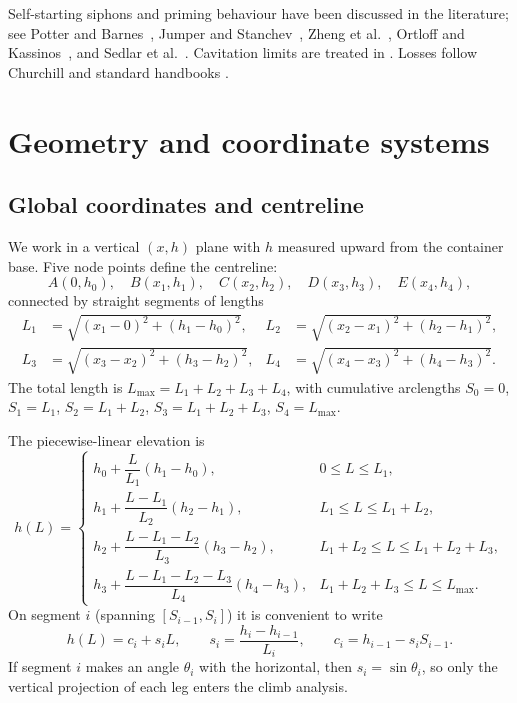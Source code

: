\documentclass[11pt]{article}
\begin{document}
Self-starting siphons and priming behaviour have been discussed in the literature; see Potter and Barnes~\cite{potter_barnes}, Jumper and Stanchev~\cite{jumper_stanchev}, Zheng et al.~\cite{zheng_siphon}, Ortloff and Kassinos~\cite{ortloff_kassinos}, and Sedlar et al.~\cite{sedlar_siphon}. Cavitation limits are treated in \cite{boatwright,vera,tyree}. Losses follow Churchill \cite{churchill} and standard handbooks \cite{crane,colebrook,moody,white}.

\section{Geometry and coordinate systems}
\label{sec:geometry}

\subsection{Global coordinates and centreline}
We work in a vertical $(x,h)$ plane with $h$ measured upward from the container base. Five node points define the centreline:
\[
  A(0,h_0),\quad B(x_1,h_1),\quad C(x_2,h_2),\quad D(x_3,h_3),\quad E(x_4,h_4),
\]
connected by straight segments of lengths
\begin{align*}
  L_1 &= \sqrt{(x_1-0)^2 + (h_1-h_0)^2}, &
  L_2 &= \sqrt{(x_2-x_1)^2 + (h_2-h_1)^2},\\
  L_3 &= \sqrt{(x_3-x_2)^2 + (h_3-h_2)^2}, &
  L_4 &= \sqrt{(x_4-x_3)^2 + (h_4-h_3)^2}.
\end{align*}
The total length is $L_{\max}=L_1+L_2+L_3+L_4$, with cumulative arclengths $S_0=0$, $S_1=L_1$, $S_2=L_1+L_2$, $S_3=L_1+L_2+L_3$, $S_4=L_{\max}$.

The piecewise-linear elevation is
\[
h(L)=
\begin{cases}
  h_0 + \dfrac{L}{L_1}(h_1-h_0), & 0\le L\le L_1,\\[0.8em]
  h_1 + \dfrac{L-L_1}{L_2}(h_2-h_1), & L_1\le L\le L_1+L_2,\\[0.8em]
  h_2 + \dfrac{L-L_1-L_2}{L_3}(h_3-h_2), & L_1+L_2\le L\le L_1+L_2+L_3,\\[0.8em]
  h_3 + \dfrac{L-L_1-L_2-L_3}{L_4}(h_4-h_3), & L_1+L_2+L_3\le L\le L_{\max}.
\end{cases}
\]
On segment $i$ (spanning $[S_{i-1},S_i]$) it is convenient to write
\begin{equation}
  h(L) = c_i + s_i L,\qquad
  s_i = \frac{h_i-h_{i-1}}{L_i},\qquad
  c_i = h_{i-1} - s_i S_{i-1}.
  \label{eq:linear-hi}
\end{equation}
If segment $i$ makes an angle $\theta_i$ with the horizontal, then $s_i=\sin\theta_i$, so only the vertical projection of each leg enters the climb analysis.
\end{document}
